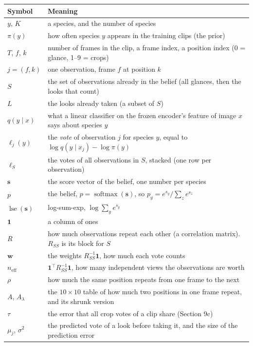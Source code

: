 \documentclass[11pt]{article}
\newcommand{\one}{\mathbf{1}}
\newcommand{\lse}{\operatorname{lse}}
\newcommand{\softmax}{\operatorname{softmax}}
\begin{document}
\begin{center}
\small
\begin{tabularx}{\textwidth}{@{}>{\raggedright\arraybackslash}p{2.6cm}X@{}}
\toprule
Symbol & Meaning \\
\midrule
$y$, $K$ & a species, and the number of species \\
$\pi(y)$ & how often species $y$ appears in the training clips (the prior) \\
$T$, $f$, $k$ & number of frames in the clip, a frame index, a position index (0 = glance, 1--9 = crops) \\
$j=(f,k)$ & one observation, frame $f$ at position $k$ \\
$S$ & the set of observations already in the belief (all glances, then the looks that count) \\
$L$ & the looks already taken (a subset of $S$) \\
$q(y\mid x)$ & what a linear classifier on the frozen encoder's feature of image $x$ says about species $y$ \\
$\ell_j(y)$ & the \emph{vote} of observation $j$ for species $y$, equal to $\log q(y\mid x_j)-\log\pi(y)$ \\
$\bm\ell_S$ & the votes of all observations in $S$, stacked (one row per observation) \\
$\mathbf s$ & the score vector of the belief, one number per species \\
$p$ & the belief, $p=\softmax(\mathbf s)$, so $p_y=e^{s_y}/\sum_z e^{s_z}$ \\
$\lse(\mathbf s)$ & log-sum-exp, $\log\sum_y e^{s_y}$ \\
$\one$ & a column of ones \\
$R$ & how much observations repeat each other (a correlation matrix). $R_{SS}$ is its block for $S$ \\
$\bm w$ & the weights $R_{SS}^{-1}\one$, how much each vote counts \\
$n_{\text{eff}}$ & $\one^\top R_{SS}^{-1}\one$, how many independent views the observations are worth \\
$\rho$ & how much the same position repeats from one frame to the next \\
$A$, $A_\lambda$ & the $10\times10$ table of how much two positions in one frame repeat, and its shrunk version \\
$\tau$ & the error that all crop votes of a clip share (Section 9c) \\
$\mu_j$, $\sigma^2$ & the predicted vote of a look before taking it, and the size of the prediction error \\

\end{tabularx}
\end{center}
\end{document}
